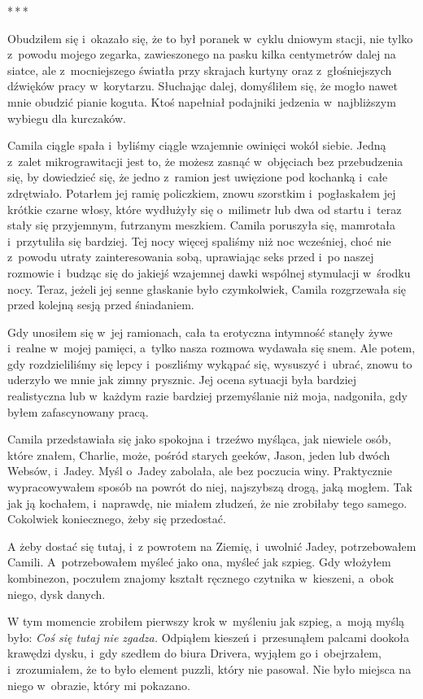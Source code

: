 \documentclass[oneside,polish,12pt,sfheadings]{mwbk}
\newcommand{\threeast}{\bigskip\par\centerline{*\,*\,*}\medskip\par}%
\begin{document}
\threeast

Obudziłem się i~okazało się, że to był poranek w~cyklu dniowym stacji,
nie tylko z~powodu mojego zegarka, zawieszonego na pasku kilka
centymetrów dalej na siatce, ale z~mocniejszego światła przy skrajach
kurtyny oraz z~głośniejszych dźwięków pracy w~korytarzu. Słuchając
dalej, domyśliłem się, że mogło nawet mnie obudzić pianie koguta. Ktoś
napełniał podajniki jedzenia w~najbliższym wybiegu dla kurczaków.

Camila ciągle spała i~byliśmy ciągle wzajemnie owinięci wokół siebie.
Jedną z~zalet mikrograwitacji jest to, że możesz zasnąć w~objęciach bez
przebudzenia się, by dowiedzieć się, że jedno z~ramion jest uwięzione
pod kochanką i~całe zdrętwiało. Potarłem jej ramię policzkiem, znowu
szorstkim i~pogłaskałem jej krótkie czarne włosy, które wydłużyły się o~milimetr lub dwa od startu i~teraz stały się przyjemnym, futrzanym
meszkiem. Camila poruszyła się, mamrotała i~przytuliła się bardziej. Tej
nocy więcej spaliśmy niż noc wcześniej, choć nie z~powodu utraty
zainteresowania sobą, uprawiając seks przed i~po naszej rozmowie i~budząc się do jakiejś wzajemnej dawki wspólnej stymulacji w~środku nocy.
Teraz, jeżeli jej senne głaskanie było czymkolwiek, Camila rozgrzewała
się przed kolejną sesją przed śniadaniem.

Gdy unosiłem się w~jej ramionach, cała ta erotyczna intymność stanęły
żywe i~realne w~mojej pamięci, a~tylko nasza rozmowa wydawała się snem.
Ale potem, gdy rozdzieliliśmy się lepcy i~poszliśmy wykąpać się,
wysuszyć i~ubrać, znowu to uderzyło we mnie jak zimny prysznic. Jej
ocena sytuacji była bardziej realistyczna lub w~każdym razie bardziej
przemyślanie niż moja, nadgoniła, gdy byłem zafascynowany pracą.

Camila przedstawiała się jako spokojna i~trzeźwo myśląca, jak niewiele
osób, które znałem, Charlie, może, pośród starych geeków, Jason, jeden
lub dwóch Websów, i~Jadey. Myśl o~Jadey zabolała, ale bez poczucia winy.
Praktycznie wypracowywałem sposób na powrót do niej, najszybszą drogą,
jaką mogłem. Tak jak ją kochałem, i~naprawdę, nie miałem złudzeń, że nie
zrobiłaby tego samego. Cokolwiek koniecznego, żeby się przedostać.

A żeby dostać się tutaj, i~z powrotem na Ziemię, i~uwolnić Jadey,
potrzebowałem Camili. A~potrzebowałem myśleć jako ona, myśleć jak
szpieg. Gdy włożyłem kombinezon, poczułem znajomy kształt ręcznego
czytnika w~kieszeni, a~obok niego, dysk danych.

W tym momencie zrobiłem pierwszy krok w~myśleniu jak szpieg, a~moją
myślą było: \emph{Coś się tutaj nie zgadza. } Odpiąłem kieszeń i~przesunąłem palcami dookoła krawędzi dysku, i~gdy szedłem do biura
Drivera, wyjąłem go i~obejrzałem, i~zrozumiałem, że to było element
puzzli, który nie pasował. Nie było miejsca na niego w~obrazie, który mi
pokazano.
\end{document}
